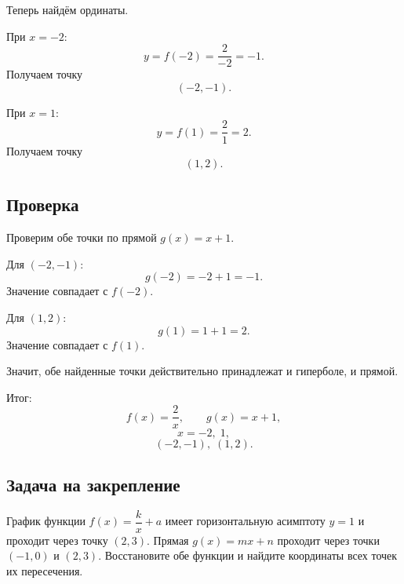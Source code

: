 \documentclass[12pt,a4paper]{article}
\begin{document}
Теперь найдём ординаты.

При \(x=-2\):
\[
  y=f(-2)=\frac{2}{-2}=-1.
\]
Получаем точку
\[
  (-2,-1).
\]

При \(x=1\):
\[
  y=f(1)=\frac{2}{1}=2.
\]
Получаем точку
\[
  (1,2).
\]

\subsection*{Проверка}
Проверим обе точки по прямой \(g(x)=x+1\).

Для \((-2,-1)\):
\[
  g(-2)=-2+1=-1.
\]
Значение совпадает с \(f(-2)\).

Для \((1,2)\):
\[
  g(1)=1+1=2.
\]
Значение совпадает с \(f(1)\).

Значит, обе найденные точки действительно принадлежат и гиперболе, и прямой.

\textcolor{teal!60!black}{Итог:}
\[
  \boxed{f(x)=\frac{2}{x}}, \qquad \boxed{g(x)=x+1},
\]
\[
  \boxed{x=-2,\;1},
\]
\[
  \boxed{(-2,-1),\;(1,2)}.
\]

\subsection*{Задача на закрепление}
График функции \(f(x)=\dfrac{k}{x}+a\) имеет горизонтальную асимптоту \(y=1\) и проходит через точку \((2,3)\). Прямая \(g(x)=mx+n\) проходит через точки \((-1,0)\) и \((2,3)\). Восстановите обе функции и найдите координаты всех точек их пересечения.
\end{document}

